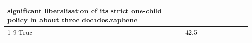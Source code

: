 \begin{table}[H]
\begin{tabular}{lllrlllll}
significant liberalisation of its strict one-child policy in about three decades.raphene \\
\cline{1-9}
True & 42.5%
\end{tabular}
\end{table}
